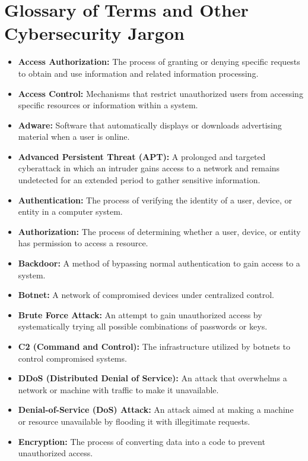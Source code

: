 \documentclass{article}
\begin{document}
\section*{Glossary of Terms and Other Cybersecurity Jargon}
\small
\begin{itemize}
    \item \textbf{Access Authorization:} The process of granting or denying specific requests to obtain and use information and related information processing.
    \item \textbf{Access Control:} Mechanisms that restrict unauthorized users from accessing specific resources or information within a system.
    \item \textbf{Adware:} Software that automatically displays or downloads advertising material when a user is online.
    \item \textbf{Advanced Persistent Threat (APT):} A prolonged and targeted cyberattack in which an intruder gains access to a network and remains undetected for an extended period to gather sensitive information.
    \item \textbf{Authentication:} The process of verifying the identity of a user, device, or entity in a computer system.
    \item \textbf{Authorization:} The process of determining whether a user, device, or entity has permission to access a resource.
    \item \textbf{Backdoor:} A method of bypassing normal authentication to gain access to a system.
    \item \textbf{Botnet:} A network of compromised devices under centralized control.
    \item \textbf{Brute Force Attack:} An attempt to gain unauthorized access by systematically trying all possible combinations of passwords or keys.
    \item \textbf{C2 (Command and Control):} The infrastructure utilized by botnets to control compromised systems.
    \item \textbf{DDoS (Distributed Denial of Service):} An attack that overwhelms a network or machine with traffic to make it unavailable.
    \item \textbf{Denial-of-Service (DoS) Attack:} An attack aimed at making a machine or resource unavailable by flooding it with illegitimate requests.
    \item \textbf{Encryption:} The process of converting data into a code to prevent unauthorized access.

\end{itemize}
\end{document}
